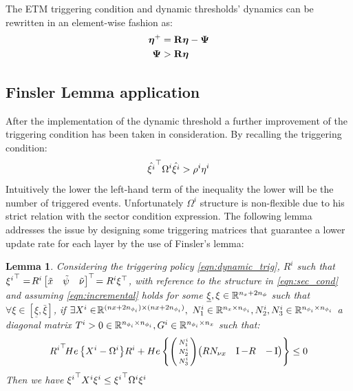 \documentclass{ifacconf}
\theoremstyle{plain}
\newtheorem{lemma}{Lemma}
\begin{document}
The ETM triggering condition and dynamic thresholds' dynamics can be rewritten in an element-wise fashion as:
\begin{equation}
\begin{aligned}
    \boldsymbol{\eta}^+ &= {\bf{R}} \boldsymbol{\eta} - \mathbf{\Psi}\\
    \mathbf{\Psi} &> {\bf{R}} \boldsymbol{\eta}
\end{aligned}
\end{equation}

\subsection{Finsler Lemma application}
After the implementation of the dynamic threshold a further improvement of the triggering condition has been taken in consideration. By recalling the triggering condition:
$$
\hat{{\xi^i}}^\top \Omega^i \hat{\xi^i} > \rho^i \eta^i
$$
Intuitively the lower the left-hand term of the inequality the lower will be the number of triggered events. Unfortunately $\Omega^i$ structure is non-flexible due to his strict relation with the sector condition expression. The following lemma addresses the issue by designing some triggering matrices that guarantee a lower update rate for each layer by the use of Finsler's lemma:

\begin{lemma}\label{lem:finsler} \emph{Considering the triggering policy \eqref{eqn:dynamic_trig}, $R^i$ such that ${\xi^i}^\top = \!R^i \left[\begin{matrix}\tilde{x} & \tilde{\psi} & \tilde{\nu}\end{matrix}\right]^\top\! = R^i \xi^\top$, with reference to the structure in \eqref{eqn:sec_cond} and assuming \eqref{eqn:incremental} holds for some $\underline{\xi}, \relax{\xi} \in {\mathbb{R}}^{n_x + 2n_{\phi}}$ such that $\forall \xi \in \left[ \underline{\xi}, \bar{\xi}\right]$, if $\exists X^i \in\! {\mathbb{R}}^{(nx + 2n_{\phi_i}) \times (nx + 2n_{\phi_i})},$ $N^i_1 \in {\mathbb{R}}^{n_x \times n_{\phi_i}}, N^i_2, N^i_3 \in {\mathbb{R}}^{n_{\phi_i} \times n_{\phi_i}}$ a diagonal matrix $T^i > 0 \in {\mathbb{R}}^{n_{\phi_i} \times n_{\phi_i}}, G^i \in {\mathbb{R}}^{n_{\phi_i} \times n_x}$ such that:
\begin{equation}\label{eqn:finsler}
     {R^i}^\top\! He\left\{X^i - \Omega^i\right\}\! R^i + He\left\{ \left(\begin{smallmatrix} N^i_1\\ N^i_2\\ N^i_3 \end{smallmatrix} \right)\! \left(\begin{matrix}R N_{\nu x} & \operatorname{I} - R & -\operatorname{I}\end{matrix}\right)\right\} \leq 0
\end{equation}
Then we have ${\xi^i}^\top X^i \xi^i \leq {\xi^i}^\top \Omega^i \xi^i$}
\end{lemma}
\end{document}
